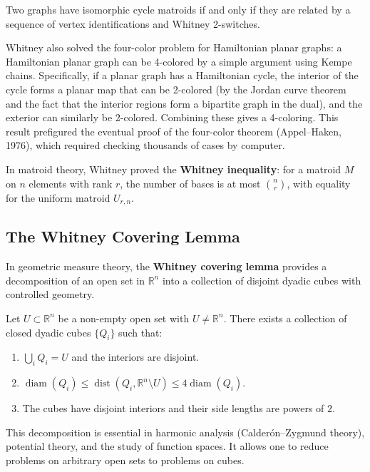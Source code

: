 \begin{theorem}
Two graphs have isomorphic cycle matroids if and only if they are related by a sequence of vertex identifications and Whitney 2-switches.
\end{theorem}

Whitney also solved the four-color problem for Hamiltonian planar graphs: a Hamiltonian planar graph can be 4-colored by a simple argument using Kempe chains. Specifically, if a planar graph has a Hamiltonian cycle, the interior of the cycle forms a planar map that can be 2-colored (by the Jordan curve theorem and the fact that the interior regions form a bipartite graph in the dual), and the exterior can similarly be 2-colored. Combining these gives a 4-coloring. This result prefigured the eventual proof of the four-color theorem (Appel--Haken, 1976), which required checking thousands of cases by computer.

In matroid theory, Whitney proved the \textbf{Whitney inequality}: for a matroid $M$ on $n$ elements with rank $r$, the number of bases is at most $\binom{n}{r}$, with equality for the uniform matroid $U_{r,n}$.

\subsection{The Whitney Covering Lemma}

In geometric measure theory, the \textbf{Whitney covering lemma} provides a decomposition of an open set in $\mathbb{R}^n$ into a collection of disjoint dyadic cubes with controlled geometry.

\begin{theorem}
Let $U \subset \mathbb{R}^n$ be a non-empty open set with $U \neq \mathbb{R}^n$. There exists a collection of closed dyadic cubes $\{Q_i\}$ such that:
\begin{enumerate}
    \item $\bigcup_i Q_i = U$ and the interiors are disjoint.
    \item $\operatorname{diam}(Q_i) \leq \operatorname{dist}(Q_i, \mathbb{R}^n \setminus U) \leq 4 \operatorname{diam}(Q_i)$.
    \item The cubes have disjoint interiors and their side lengths are powers of $2$.
\end{enumerate}
\end{theorem}

This decomposition is essential in harmonic analysis (Calder{\'o}n--Zygmund theory), potential theory, and the study of function spaces. It allows one to reduce problems on arbitrary open sets to problems on cubes.

